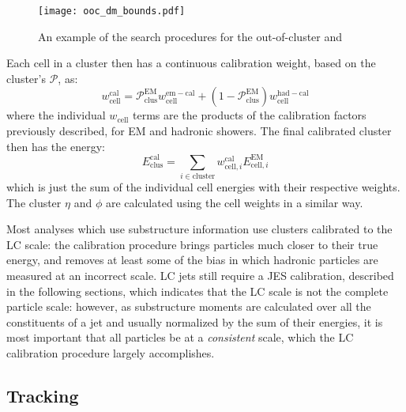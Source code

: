 
\begin{figure}
\centering
\texttt{[image: ooc\_dm\_bounds.pdf]}
\label{fig:jet-reconstruction:cluster-calibration:ooc-dm}
\caption{An example of the search procedures for the out-of-cluster and }
\end{figure}



Each cell in a cluster then has a continuous calibration weight, based on the cluster's $\mathcal{P}$, as:
%
\begin{equation}
w_\mathrm{cell}^\mathrm{cal} = \mathcal{P}^\mathrm{EM}_\mathrm{clus} w_\mathrm{cell}^\mathrm{em-cal} + (1 - \mathcal{P}_\mathrm{clus}^\mathrm{EM}) w_\mathrm{cell}^\mathrm{had-cal}
\end{equation}
%
where the individual $w_\mathrm{cell}$ terms are the products of the calibration factors previously described, for EM and hadronic showers. The final calibrated cluster then has the energy:
%
\begin{equation}
E^\mathrm{cal}_\mathrm{clus} = \sum_{i \in \mathrm{cluster}} w_{\mathrm{cell},i}^\mathrm{cal} E_{\mathrm{cell},i}^\mathrm{EM}
\end{equation}
%
which is just the sum of the individual cell energies with their respective weights. The cluster $\eta$ and $\phi$ are calculated using the cell weights in a similar way.

Most analyses which use substructure information use clusters calibrated to the LC scale: the calibration procedure brings particles much closer to their true energy, and removes at least some of the bias in which hadronic particles are measured at an incorrect scale. LC jets still require a JES calibration, described in the following sections, which indicates that the LC scale is not the complete particle scale: however, as substructure moments are calculated over all the constituents of a jet and usually normalized by the sum of their energies, it is most important that all particles be at a \textit{consistent} scale, which the LC calibration procedure largely accomplishes.

\subsection{Tracking}
\label{tracking}


